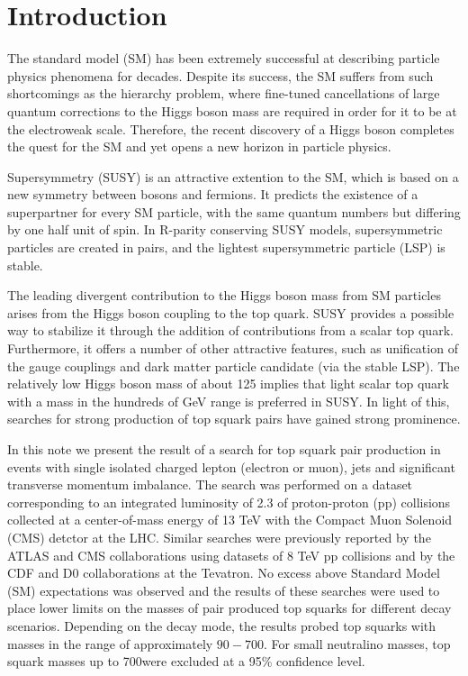 \section{Introduction}
\label{sec:intro}
The standard model (SM) has been extremely successful at describing particle physics phenomena for decades. Despite its success,
the SM suffers from such shortcomings as the hierarchy problem, where fine-tuned cancellations of large quantum corrections to the Higgs
boson mass are required in order for it to be at the electroweak scale. Therefore, the recent discovery of a Higgs boson completes the
quest for the SM and yet opens a new horizon in particle physics.

Supersymmetry (SUSY) is an attractive extention to the SM, which is based on a new symmetry between bosons and fermions. It
predicts the existence of a superpartner for every SM particle, with the same quantum numbers but differing by one half unit of spin.
In R-parity conserving SUSY models, supersymmetric particles are created in pairs, and the lightest supersymmetric particle (LSP)
is stable.

The leading divergent contribution to the Higgs boson mass from SM particles arises from the Higgs boson coupling to the top quark.
SUSY provides a possible way to stabilize it through the addition of contributions from a scalar top quark. Furthermore, it offers a
number of other attractive features, such as unification of the gauge couplings and dark matter particle candidate (via the stable LSP).
The relatively low Higgs boson mass of about 125 \GeV implies that light scalar top quark with a mass
in the hundreds of GeV range is preferred in SUSY. In light of this, searches for strong production of top squark pairs have gained strong
prominence.

In this note we present the result of a search for top squark pair production in events with single isolated charged lepton (electron or muon),
jets and significant transverse momentum imbalance. The search was performed on a dataset corresponding to an integrated luminosity of 2.3\fbinv
of proton-proton (pp) collisions collected at a center-of-mass energy of 13 TeV with the Compact Muon Solenoid (CMS) detctor at the LHC.
Similar searches were previously reported by the ATLAS and CMS collaborations using datasets of 8 TeV pp collisions and by the CDF
and D0 collaborations at the Tevatron. No excess above Standard Model (SM) expectations was observed and the results of these searches were
used to place lower limits on the masses of pair produced top squarks for different decay scenarios. Depending on the decay mode, the results
probed top squarks with masses in the range of approximately $90-700$\GeV. For small neutralino masses, top squark masses up to 700\GeV were
excluded at a 95\% confidence level.

